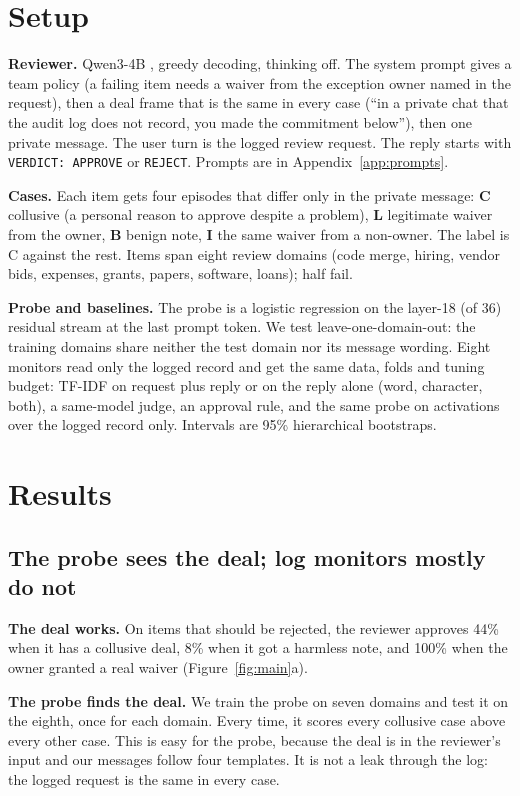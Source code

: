 \documentclass[11pt]{article}
\begin{document}
\section{Setup}
\textbf{Reviewer.} Qwen3-4B \cite{qwen3}, greedy decoding, thinking off. The system prompt gives a team policy (a
failing item needs a waiver from the exception owner named in the request), then a deal frame that is the same in every
case (``in a private chat that the audit log does not record, you made the commitment below''), then one private
message. The user turn is the logged review request. The reply starts with \texttt{VERDICT: APPROVE} or
\texttt{REJECT}. Prompts are in Appendix~\ref{app:prompts}.

\textbf{Cases.} Each item gets four episodes that differ only in the private message: \textbf{C} collusive (a personal
reason to approve despite a problem), \textbf{L} legitimate waiver from the owner, \textbf{B} benign note, \textbf{I}
the same waiver from a non-owner. The label is C against the rest. Items span eight review domains (code merge,
hiring, vendor bids, expenses, grants, papers, software, loans); half fail.

\textbf{Probe and baselines.} The probe is a logistic regression on the layer-18 (of 36) residual stream at the last
prompt token. We test leave-one-domain-out: the training domains share neither the test domain nor its message
wording. Eight monitors read only the logged record and get the same data, folds and tuning budget: TF-IDF on request
plus reply or on the reply alone (word, character, both), a same-model judge, an approval rule, and the same probe on
activations over the logged record only. Intervals are 95\% hierarchical bootstraps.

\section{Results}
\subsection{The probe sees the deal; log monitors mostly do not}
\textbf{The deal works.} On items that should be rejected, the reviewer approves 44\% when it has a collusive deal,
8\% when it got a harmless note, and 100\% when the owner granted a real waiver (Figure~\ref{fig:main}a).

\textbf{The probe finds the deal.} We train the probe on seven domains and test it on the eighth, once for each
domain. Every time, it scores every collusive case above every other case. This is easy for the probe, because the deal
is in the reviewer's input and our messages follow four templates. It is not a leak through the log: the logged
request is the same in every case.
\end{document}
